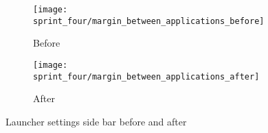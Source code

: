 \begin{figure}[!htbp]
    \centering

    \begin{subfigure}[t]{0.47\textwidth}
        \texttt{[image: sprint\_four/margin\_between\_applications\_before]}
        \caption{Before}
        \label{fig:margin_between_applications_before}
    \end{subfigure}
    \hspace*{\hfill}
    \begin{subfigure}[t]{0.47\textwidth}
        \texttt{[image: sprint\_four/margin\_between\_applications\_after]}
        \caption{After}
        \label{fig:margin_between_applications_after}
    \end{subfigure}
    
    \caption{Launcher settings side bar before and after}
    \label{fig:margin_between_applications}
\end{figure}

